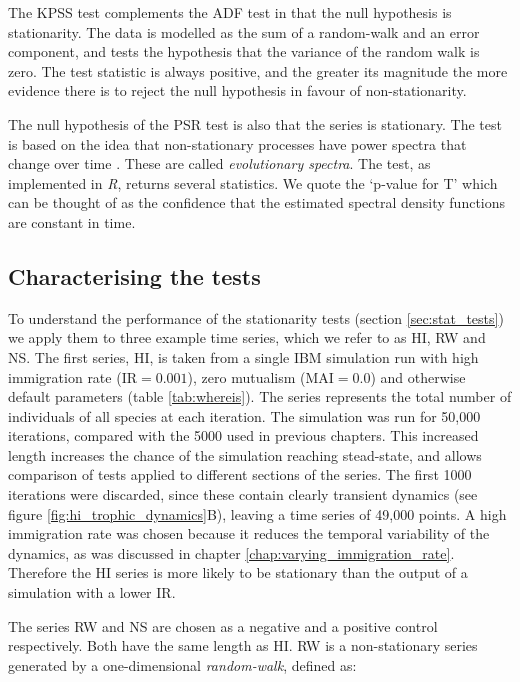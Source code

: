 The KPSS test complements the ADF test in that the null hypothesis is stationarity. The data is modelled as the sum of a random-walk and an error component, and tests the hypothesis that the variance of the random walk is zero. The test statistic is always positive, and the greater its magnitude the more evidence there is to reject the null hypothesis in favour of non-stationarity.

The null hypothesis of the PSR test is also that the series is stationary. The test is based on the idea that non-stationary processes have power spectra that change over time \cite{priestley1969test}. These are called \emph{evolutionary spectra}. The test, as implemented in \emph{R}, returns several statistics. We quote the `p-value for T' which can be thought of as the confidence that the estimated spectral density functions are constant in time.

\subsection{Characterising the tests}
\label{sec:characterising_stat_tests}


To understand the performance of the stationarity tests (section \ref{sec:stat_tests}) we apply them to three example time series, which we refer to as HI, RW and NS. The first series, HI, is taken from a single IBM simulation run with high immigration rate (IR$=0.001$), zero mutualism (MAI$=0.0$) and otherwise default parameters (table \ref{tab:whereis}).  The series represents the total number of individuals of all species at each iteration. The simulation was run for 50,000 iterations, compared with the 5000 used in previous chapters. This increased length increases the chance of the simulation reaching stead-state, and allows comparison of tests applied to different sections of the series. The first 1000 iterations were discarded, since these contain clearly transient dynamics (see figure \ref{fig:hi_trophic_dynamics}B), leaving a time series of 49,000 points. A high immigration rate was chosen because it reduces the temporal variability of the dynamics, as was discussed in chapter \ref{chap:varying_immigration_rate}. Therefore the HI series is more likely to be stationary than the output of a simulation with a lower IR.

The series RW and NS are chosen as a negative and a positive control respectively. Both have the same length as HI. RW is a non-stationary series generated by a one-dimensional \emph{random-walk}, defined as:

